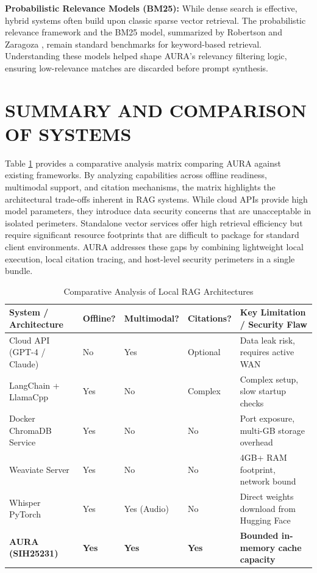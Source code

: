 \documentclass[12pt,a4paper]{report}
\begin{document}
\vspace{0.3cm}
\noindent\textbf{Probabilistic Relevance Models (BM25):} While dense search is effective, hybrid systems often build upon classic sparse vector retrieval. The probabilistic relevance framework and the BM25 model, summarized by Robertson and Zaragoza \cite{bm25_paper}, remain standard benchmarks for keyword-based retrieval. Understanding these models helped shape AURA's relevancy filtering logic, ensuring low-relevance matches are discarded before prompt synthesis.

\newpage
\section{SUMMARY AND COMPARISON OF SYSTEMS}
Table \ref{tab:system_comparison} provides a comparative analysis matrix comparing AURA against existing frameworks. By analyzing capabilities across offline readiness, multimodal support, and citation mechanisms, the matrix highlights the architectural trade-offs inherent in RAG systems. While cloud APIs provide high model parameters, they introduce data security concerns that are unacceptable in isolated perimeters. Standalone vector services offer high retrieval efficiency but require significant resource footprints that are difficult to package for standard client environments. AURA addresses these gaps by combining lightweight local execution, local citation tracing, and host-level security perimeters in a single bundle.

\begin{table}[!ht]
\centering
\small
\begin{tabularx}{\textwidth}{|>{\hsize=0.9\hsize}X|>{\hsize=0.6\hsize}X|>{\hsize=0.8\hsize}X|>{\hsize=0.7\hsize}X|>{\hsize=2.0\hsize}X|}
\hline
\textbf{System / Architecture} & \textbf{Offline?} & \textbf{Multimodal?} & \textbf{Citations?} & \textbf{Key Limitation / Security Flaw} \\ \hline
Cloud API (GPT-4 / Claude) & No & Yes & Optional & Data leak risk, requires active WAN \\ \hline
LangChain + LlamaCpp & Yes & No & Complex & Complex setup, slow startup checks \\ \hline
Docker ChromaDB Service & Yes & No & No & Port exposure, multi-GB storage overhead \\ \hline
Weaviate Server & Yes & No & No & 4GB+ RAM footprint, network bound \\ \hline
Whisper PyTorch & Yes & Yes (Audio) & No & Direct weights download from Hugging Face \\ \hline
\textbf{AURA (SIH25231)} & \textbf{Yes} & \textbf{Yes} & \textbf{Yes} & \textbf{Bounded in-memory cache capacity} \\ \hline
\end{tabularx}
\caption{Comparative Analysis of Local RAG Architectures}
\label{tab:system_comparison}
\end{table}
\end{document}
